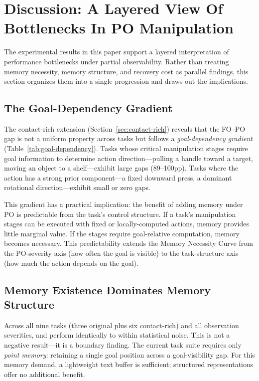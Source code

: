 \section{Discussion: A Layered View Of Bottlenecks In PO Manipulation}
\label{sec:discussion}

The experimental results in this paper support a layered interpretation of performance bottlenecks under partial observability. Rather than treating memory necessity, memory structure, and recovery cost as parallel findings, this section organizes them into a single progression and draws out the implications.

\subsection{The Goal-Dependency Gradient}

The contact-rich extension (Section~\ref{sec:contact-rich}) reveals that the FO--PO gap is not a uniform property across tasks but follows a \emph{goal-dependency gradient} (Table~\ref{tab:goal-dependency}). Tasks whose critical manipulation stages require goal information to determine action direction---pulling a handle toward a target, moving an object to a shelf---exhibit large gaps (89--100pp). Tasks where the action has a strong prior component---a fixed downward press, a dominant rotational direction---exhibit small or zero gaps.

This gradient has a practical implication: the benefit of adding memory under PO is predictable from the task's control structure. If a task's manipulation stages can be executed with fixed or locally-computed actions, memory provides little marginal value. If the stages require goal-relative computation, memory becomes necessary. This predictability extends the Memory Necessity Curve from the PO-severity axis (how often the goal is visible) to the task-structure axis (how much the action depends on the goal).

\subsection{Memory Existence Dominates Memory Structure}

Across all nine tasks (three original plus six contact-rich) and all observation severities,  and  perform identically to within statistical noise. This is not a negative result---it is a boundary finding. The current task suite requires only \emph{point memory}: retaining a single goal position across a goal-visibility gap. For this memory demand, a lightweight text buffer is sufficient; structured representations offer no additional benefit.

